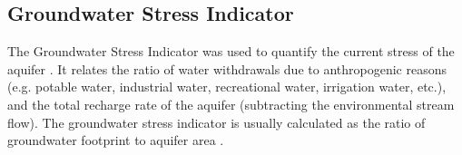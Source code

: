 \subsection{Groundwater Stress Indicator}
The Groundwater Stress Indicator was used to quantify the current stress of the aquifer \cite{Aqueductglobalmaps2015}. It relates the ratio of water withdrawals due to anthropogenic reasons (e.g. potable water, industrial water, recreational water, irrigation water, etc.), and the total recharge rate of the aquifer (subtracting the environmental stream flow). The groundwater stress indicator is usually calculated as the ratio of groundwater footprint to aquifer area \cite{RegionalGroundwaterStress2013}.







